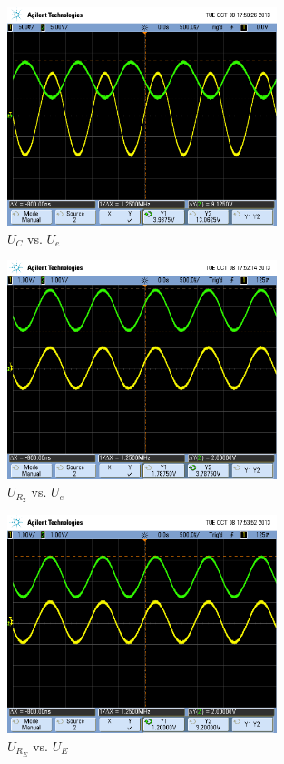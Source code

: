 \begin{frame}
	\begin{figure}
		\centering
		\includegraphics[width=0.7\textwidth]{scope_1.png}
		\caption{$U_C$ vs. $U_e$}
	\end{figure}
\end{frame}

\begin{frame}
	\begin{figure}
		\centering
		\includegraphics[width=0.7\textwidth]{scope_2.png}
		\caption{$U_{R_2}$ vs. $U_e$}
	\end{figure}
\end{frame}

\begin{frame}
	\begin{figure}
		\centering
		\includegraphics[width=0.7\textwidth]{scope_3.png}
		\caption{$U_{R_E}$ vs. $U_E$}
	\end{figure}
\end{frame}

